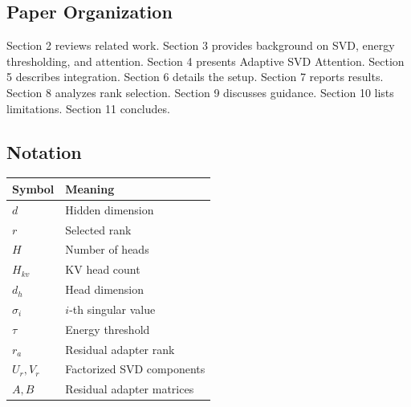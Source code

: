\subsection{Paper Organization}

Section 2 reviews related work. Section 3 provides background on SVD, energy 
thresholding, and attention. Section 4 presents Adaptive SVD Attention. 
Section 5 describes integration. Section 6 details the setup. Section 7 
reports results. Section 8 analyzes rank selection. Section 9 discusses 
guidance. Section 10 lists limitations. Section 11 concludes.



\subsection{Notation}

\begin{table}[H]
\centering
\small
\begin{tabular}{ll}
\toprule
\textbf{Symbol} & \textbf{Meaning} \\
\midrule
$d$ & Hidden dimension \\
$r$ & Selected rank \\
$H$ & Number of heads \\
$H_{kv}$ & KV head count \\
$d_h$ & Head dimension \\
$\sigma_i$ & $i$-th singular value \\
$\tau$ & Energy threshold \\
$r_a$ & Residual adapter rank \\
$U_r, V_r$ & Factorized SVD components \\
$A, B$ & Residual adapter matrices \\
\bottomrule
\end{tabular}
\end{table}


